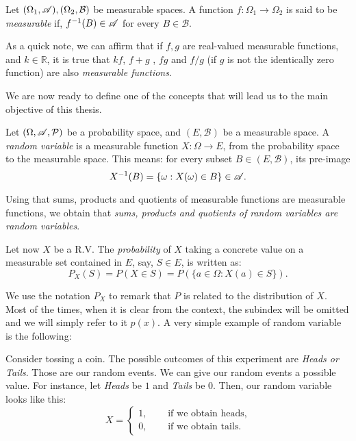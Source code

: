 \begin{ndef}
Let $(\Omega_1, \mathscr{A}),(\Omega_2, \mathcal B)$ be measurable spaces. A function $f: \Omega_1 \to \Omega_2$ is said to be \emph{measurable} if, $f^{-1}(B) \in \mathscr{A}$ for every $B \in \mathcal B$.
\end{ndef}

As a quick note, we can affirm that if $f,g$ are real-valued measurable functions, and $k \in \mathbb R$, it is true that $kf$, $f+g$ , $fg$ and $f/g$ (if $g$ is not the identically zero function) are also \emph{measurable functions}.

We are now ready to define one of the concepts that will lead us to the main objective of this thesis.

\begin{ndef}
Let $(\Omega,\mathscr{A},\mathcal{P})$ be a probability space, and $(E,\mathcal B)$ be a measurable space. 
A \emph{random variable} is a measurable function $X: \Omega \to E$, from the probability space to the measurable space. This means: for every subset $B \in (E,\mathcal B)$, its pre-image
$$
X^{-1}(B) = \{\omega : X(\omega) \in B\} \in \mathscr{A} .
$$
\end{ndef}

Using that sums, products and quotients of measurable functions are measurable functions, we obtain that \emph{sums, products and quotients of random variables are random variables}.

Let now $X$ be a R.V. The \emph{probability} of $X$ taking a concrete value on a measurable set contained in $E$, say, $S \in E$, is written as:
$$
P_X(S) = P(X \in S) = P(\{a \in \Omega : X(a) \in S\}).
$$

We use the notation $P_X$ to remark that $P$ is related to the distribution of $X$. Most of the times, when it is clear from the context, the subindex will be omitted and we will simply refer to it $p(x)$. A very simple example of random variable is the following:

\begin{nexample}
  Consider tossing a coin. The possible outcomes of this experiment are \emph{Heads or Tails}. Those are our random events. We can give our random events a possible value. 
  For instance, let \emph{Heads} be $1$ and \emph{Tails} be $0$. Then, our random variable looks like this:
  \begin{equation*}
      X  = \left\{ \begin{aligned}
  1, \quad & \text{ if we obtain heads,} \\
  0, \quad & \text{ if we obtain tails.}
\end{aligned}\right.
  \end{equation*}

\end{nexample}

